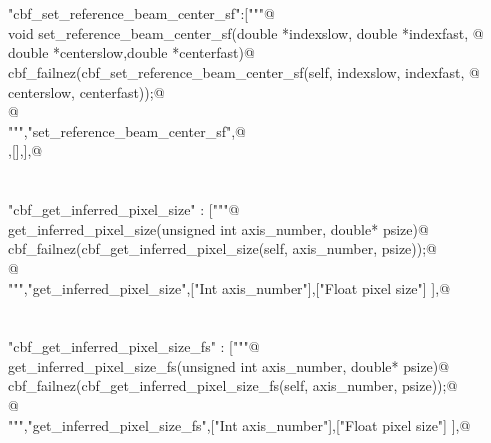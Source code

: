 \documentclass[10pt,a4paper,twoside,notitlepage]{article}
\begin{document}
\begin{flushleft}
\begin{list}{}{}
\mbox{}\verb@@\\
\mbox{}\verb@@\\
\mbox{}\verb@"cbf_set_reference_beam_center_sf":["""@\\
\mbox{}\verb@    void set_reference_beam_center_sf(double *indexslow, double *indexfast, @\\
\mbox{}\verb@                         double *centerslow,double *centerfast){@\\
\mbox{}\verb@        cbf_failnez(cbf_set_reference_beam_center_sf(self, indexslow, indexfast, @\\
\mbox{}\verb@                                       centerslow, centerfast));@\\
\mbox{}\verb@        }@\\
\mbox{}\verb@""","set_reference_beam_center_sf",@\\
\mbox{},[],],@\\
\mbox{}\verb@@\\
\mbox{}\verb@@\\
\mbox{}\verb@"cbf_get_inferred_pixel_size" : ["""@\\
\mbox{}\verb@%apply double *OUTPUT { double *psize } get_inferred_pixel_size;@\\
\mbox{}\verb@void get_inferred_pixel_size(unsigned int axis_number, double* psize){@\\
\mbox{}\verb@   cbf_failnez(cbf_get_inferred_pixel_size(self, axis_number, psize));@\\
\mbox{}\verb@   }@\\
\mbox{}\verb@""","get_inferred_pixel_size",["Int axis_number"],["Float pixel size"] ],@\\
\mbox{}\verb@@\\
\mbox{}\verb@@\\
\mbox{}\verb@"cbf_get_inferred_pixel_size_fs" : ["""@\\
\mbox{}\verb@%apply double *OUTPUT { double *psize } get_inferred_pixel_size;@\\
\mbox{}\verb@void get_inferred_pixel_size_fs(unsigned int axis_number, double* psize){@\\
\mbox{}\verb@   cbf_failnez(cbf_get_inferred_pixel_size_fs(self, axis_number, psize));@\\
\mbox{}\verb@   }@\\
\mbox{}\verb@""","get_inferred_pixel_size_fs",["Int axis_number"],["Float pixel size"] ],@\\
\mbox{}\verb@@\\

\end{list}
\end{flushleft}
\end{document}
